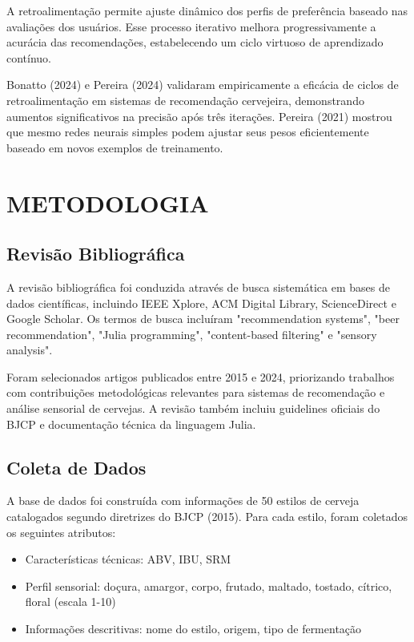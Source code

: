 \documentclass[12pt,a4paper]{article}
\begin{document}
A retroalimentação permite ajuste dinâmico dos perfis de preferência baseado nas avaliações dos usuários. Esse processo iterativo melhora progressivamente a acurácia das recomendações, estabelecendo um ciclo virtuoso de aprendizado contínuo.

Bonatto (2024) e Pereira (2024) validaram empiricamente a eficácia de ciclos de retroalimentação em sistemas de recomendação cervejeira, demonstrando aumentos significativos na precisão após três iterações. Pereira (2021) mostrou que mesmo redes neurais simples podem ajustar seus pesos eficientemente baseado em novos exemplos de treinamento.

\newpage
\section{METODOLOGIA}

\subsection{Revisão Bibliográfica}

A revisão bibliográfica foi conduzida através de busca sistemática em bases de dados científicas, incluindo IEEE Xplore, ACM Digital Library, ScienceDirect e Google Scholar. Os termos de busca incluíram "recommendation systems", "beer recommendation", "Julia programming", "content-based filtering" e "sensory analysis".

Foram selecionados artigos publicados entre 2015 e 2024, priorizando trabalhos com contribuições metodológicas relevantes para sistemas de recomendação e análise sensorial de cervejas. A revisão também incluiu guidelines oficiais do BJCP e documentação técnica da linguagem Julia.

\subsection{Coleta de Dados}

A base de dados foi construída com informações de 50 estilos de cerveja catalogados segundo diretrizes do BJCP (2015). Para cada estilo, foram coletados os seguintes atributos:

\begin{itemize}
\item Características técnicas: ABV, IBU, SRM
\item Perfil sensorial: doçura, amargor, corpo, frutado, maltado, tostado, cítrico, floral (escala 1-10)
\item Informações descritivas: nome do estilo, origem, tipo de fermentação
\end{itemize}
\end{document}

